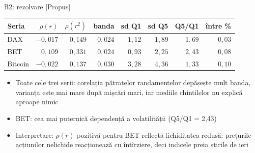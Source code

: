 \ifsolutions
\begin{frame}{B2: rezolvare [Propus]}
\itemsize{\footnotesize}
\begin{center}
\footnotesize
\begin{tabular}{lrrrrrrr}
\toprule
Seria & $\rho(r)$ & $\rho(r^2)$ & banda & sd Q1 & sd Q5 & Q5/Q1 & între \% \\
\midrule
DAX & $-0{,}017$ & $0{,}149$ & $0{,}024$ & $1{,}12$ & $1{,}89$ & $1{,}69$ & $0{,}03$ \\
BET & $0{,}109$ & $0{,}331$ & $0{,}024$ & $0{,}93$ & $2{,}25$ & $2{,}43$ & $0{,}08$ \\
Bitcoin & $-0{,}022$ & $0{,}137$ & $0{,}030$ & $3{,}28$ & $4{,}36$ & $1{,}33$ & $0{,}10$ \\
\bottomrule
\end{tabular}
\end{center}
\begin{itemize}
    \item Toate cele trei serii: corelația pătratelor randamentelor depășește mult banda, varianța este mai mare după mișcări mari, iar mediile chintilelor nu explică aproape nimic
    \item BET: cea mai puternică dependență a volatilității (Q5/Q1 = 2{,}43)
    \item Interpretare: $\rho(r)$ pozitivă pentru BET reflectă lichiditatea redusă: prețurile acțiunilor nelichide reacționează cu întîrziere, deci indicele preia știrile de ieri
\end{itemize}
\end{frame}
\fi

